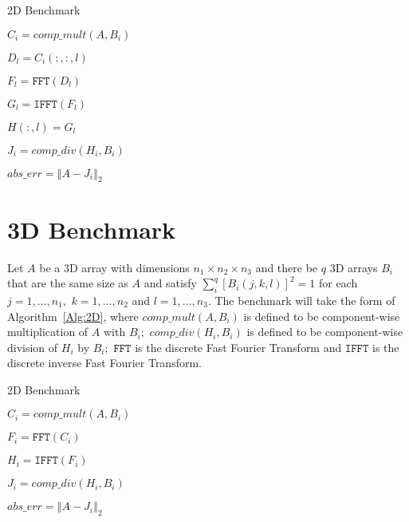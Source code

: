 \documentclass[a4]{article}
\newcommand{\norm}[1]{\left\Vert#1\right\Vert}
\begin{document}
\begin{algorithm}\caption{2D Benchmark}\label{Alg:2D}
\noindent \hrulefill

\begin{algorithmic}



\STATE $C_i = comp\_mult(A,B_i)$



\STATE $D_l = C_i(:,:,l)$

\STATE $F_l = \texttt{FFT}(D_l)$


\STATE $G_l = \texttt{IFFT}(F_l)$

\STATE $H(:,l) = G_l$

\ENDIF


\ENDFOR


\STATE $J_i = comp\_div(H_i,B_i) $

\STATE $abs\_err = \norm{A-J_i}_2$

\ENDIF

\ENDFOR

\end{algorithmic}
\noindent \hrulefill

\end{algorithm}

\section{3D Benchmark}
Let $A$ be a 3D array with dimensions $n_1\times n_2\times n_3$ and there be $q$ 
3D arrays $B_i$ that are the same size as $A$ and satisfy 
$\sum_i^q \left[B_i(j,k,l)  \right]^2 = 1$ for each $j=1,\ldots,n_1,$ 
$k=1,\ldots,n_2$ and $l=1,\ldots,n_3.$  The benchmark will take the form of 
Algorithm~\ref{Alg:2D}, where $comp\_mult(A,B_i)$ is defined to be 
component-wise multiplication of $A$ with $B_i;$  $comp\_div(H_i,B_i)$ 
is defined to be component-wise division of $H_i$ by $B_i;$ $\texttt{FFT}$ 
is the discrete Fast Fourier Transform and $\texttt{IFFT}$ is the 
discrete inverse Fast Fourier Transform. 


\begin{algorithm}\caption{2D Benchmark}\label{Alg:2D}
\noindent \hrulefill

\begin{algorithmic}



\STATE $C_i = comp\_mult(A,B_i)$



\STATE $F_i = \texttt{FFT}(C_i)$


\STATE $H_i = \texttt{IFFT}(F_i)$

\STATE $J_i = comp\_div(H_i,B_i) $

\STATE $abs\_err = \norm{A-J_i}_2$

\ENDIF

\ENDFOR

\end{algorithmic}
\noindent \hrulefill

\end{algorithm}
\end{document}
